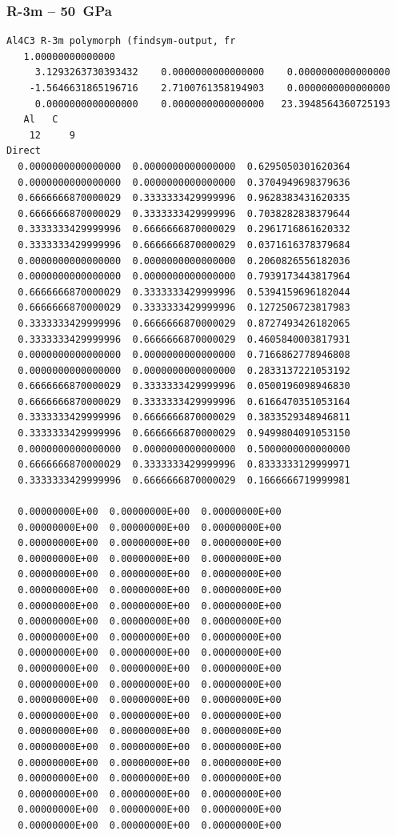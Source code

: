 \subsubsection*{R-3m -- 50~GPa}
\begin{footnotesize}
\begin{verbatim}
Al4C3 R-3m polymorph (findsym-output, fr
   1.00000000000000     
     3.1293263730393432    0.0000000000000000    0.0000000000000000
    -1.5646631865196716    2.7100761358194903    0.0000000000000000
     0.0000000000000000    0.0000000000000000   23.3948564360725193
   Al   C 
    12     9
Direct
  0.0000000000000000  0.0000000000000000  0.6295050301620364
  0.0000000000000000  0.0000000000000000  0.3704949698379636
  0.6666666870000029  0.3333333429999996  0.9628383431620335
  0.6666666870000029  0.3333333429999996  0.7038282838379644
  0.3333333429999996  0.6666666870000029  0.2961716861620332
  0.3333333429999996  0.6666666870000029  0.0371616378379684
  0.0000000000000000  0.0000000000000000  0.2060826556182036
  0.0000000000000000  0.0000000000000000  0.7939173443817964
  0.6666666870000029  0.3333333429999996  0.5394159696182044
  0.6666666870000029  0.3333333429999996  0.1272506723817983
  0.3333333429999996  0.6666666870000029  0.8727493426182065
  0.3333333429999996  0.6666666870000029  0.4605840003817931
  0.0000000000000000  0.0000000000000000  0.7166862778946808
  0.0000000000000000  0.0000000000000000  0.2833137221053192
  0.6666666870000029  0.3333333429999996  0.0500196098946830
  0.6666666870000029  0.3333333429999996  0.6166470351053164
  0.3333333429999996  0.6666666870000029  0.3833529348946811
  0.3333333429999996  0.6666666870000029  0.9499804091053150
  0.0000000000000000  0.0000000000000000  0.5000000000000000
  0.6666666870000029  0.3333333429999996  0.8333333129999971
  0.3333333429999996  0.6666666870000029  0.1666666719999981
 
  0.00000000E+00  0.00000000E+00  0.00000000E+00
  0.00000000E+00  0.00000000E+00  0.00000000E+00
  0.00000000E+00  0.00000000E+00  0.00000000E+00
  0.00000000E+00  0.00000000E+00  0.00000000E+00
  0.00000000E+00  0.00000000E+00  0.00000000E+00
  0.00000000E+00  0.00000000E+00  0.00000000E+00
  0.00000000E+00  0.00000000E+00  0.00000000E+00
  0.00000000E+00  0.00000000E+00  0.00000000E+00
  0.00000000E+00  0.00000000E+00  0.00000000E+00
  0.00000000E+00  0.00000000E+00  0.00000000E+00
  0.00000000E+00  0.00000000E+00  0.00000000E+00
  0.00000000E+00  0.00000000E+00  0.00000000E+00
  0.00000000E+00  0.00000000E+00  0.00000000E+00
  0.00000000E+00  0.00000000E+00  0.00000000E+00
  0.00000000E+00  0.00000000E+00  0.00000000E+00
  0.00000000E+00  0.00000000E+00  0.00000000E+00
  0.00000000E+00  0.00000000E+00  0.00000000E+00
  0.00000000E+00  0.00000000E+00  0.00000000E+00
  0.00000000E+00  0.00000000E+00  0.00000000E+00
  0.00000000E+00  0.00000000E+00  0.00000000E+00
  0.00000000E+00  0.00000000E+00  0.00000000E+00
\end{verbatim}
\end{footnotesize}

